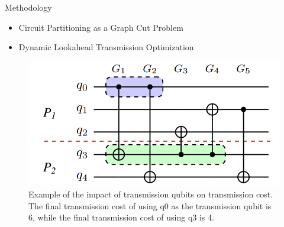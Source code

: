 \documentclass{beamer}
\begin{document}
	\begin{frame}{Methodology}
		\begin{itemize}
			\item Circuit Partitioning as a Graph Cut Problem
			\item Dynamic Lookahead Transmission Optimization
		\end{itemize}
		\begin{figure}
			\includegraphics[width=.6\textwidth]{figure/cost.png}
			\caption{Example of the impact of transmission qubits on transmission cost. The final transmission cost of using q0 as the transmission qubit is 6, while the final transmission cost of using q3 is 4.}
		\end{figure}
	\end{frame}
\end{document}
